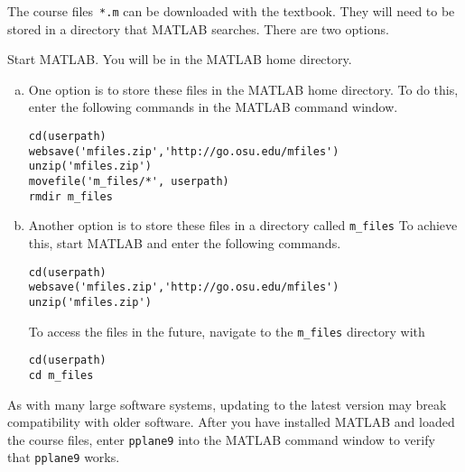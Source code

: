 \documentclass{article}
\begin{document}
The course files~\verb|*.m| can be downloaded with the textbook.
They will need to be stored in a directory that MATLAB searches.
There are two options.

Start MATLAB.  You will be in the MATLAB home directory.

\begin{enumerate}[(a)]
\item One option is to store these files in the MATLAB home
  directory.  To do this, enter the following commands in the MATLAB
  command window.
  
\begin{verbatim}
cd(userpath)
websave('mfiles.zip','http://go.osu.edu/mfiles')
unzip('mfiles.zip')
movefile('m_files/*', userpath)
rmdir m_files
\end{verbatim}
  
\item Another option is to store these files in a directory called
  \verb|m_files| To achieve this, start MATLAB and enter the following
  commands.
\begin{verbatim}
cd(userpath)
websave('mfiles.zip','http://go.osu.edu/mfiles')
unzip('mfiles.zip')
\end{verbatim}
  To access the files in the future, navigate to the \verb|m_files|
  directory with
\begin{verbatim}
cd(userpath)
cd m_files
\end{verbatim}
\end{enumerate}

As with many large software systems, updating to the latest version
may break compatibility with older software.  After you have installed
MATLAB and loaded the course files, enter \verb|pplane9| into the
MATLAB command window to verify that \verb|pplane9| works.
\end{document}
